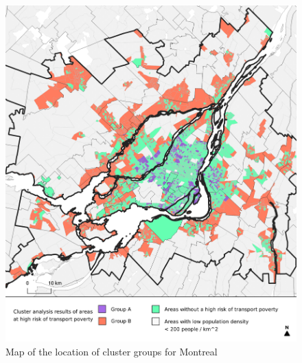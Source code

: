 \documentclass[11 pt, letterpaper]{article}
\begin{document}
{\begin{figure}[H]
	\caption{Map of the location of cluster groups for Montreal} 
	\label{C_mtl}
	\centerline{\includegraphics[width=6.5in]{figures/cluster_maps/C_mtl}}
	\vspace{2mm}
\end{figure}

}
\end{document}
